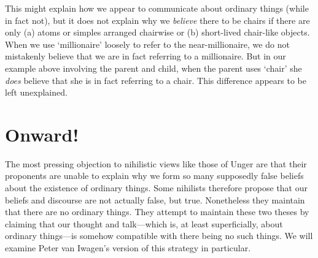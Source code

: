 \documentclass[11pt]{standalone} \newif\ifstandlone \standalonetrue
\begin{document}
\begin{spacing}{1.5}
This might explain how we appear to communicate about ordinary things
(while in fact not), but it does not explain why we {\em believe}
there to be chairs if there are only (a) atoms or simples arranged
chairwise or (b) short-lived chair-like objects.  When we use
`millionaire' loosely to refer to the near-millionaire, we do not
mistakenly believe that we are in fact referring to a millionaire.
But in our example above involving the parent and child, when the
parent uses `chair' she {\em does} believe that she is in fact
referring to a chair.  This difference appears to be left unexplained.

\section{Onward!}
The most pressing objection to nihilistic views like those of Unger
are that their proponents are unable to explain why we form so many
supposedly false beliefs about the existence of ordinary things.  Some
nihilists therefore propose that our beliefs and discourse are not
actually false, but true.  Nonetheless they maintain that there are no
ordinary things.  They attempt to maintain these two theses by
claiming that our thought and talk---which is, at least superficially,
about ordinary things---is somehow compatible with there being no such
things.  We will examine Peter van Iwagen's version of this strategy
in particular.

\ifstandalone


\end{spacing}
\fi
\end{document}
